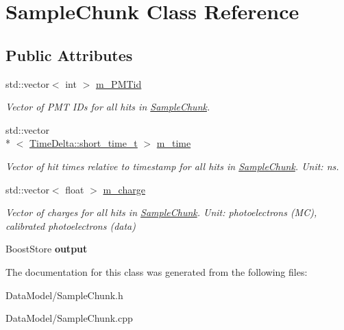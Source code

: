 \hypertarget{classSampleChunk}{\section{Sample\-Chunk Class Reference}
\label{classSampleChunk}
}
\subsection*{Public Attributes}
\begin{DoxyCompactItemize}
\item 
\hypertarget{classSampleChunk_ae227f86f1e9602b555a59145fe34fc12}{std\-::vector$<$ int $>$ \hyperlink{classSampleChunk_ae227f86f1e9602b555a59145fe34fc12}{m\-\_\-\-P\-M\-Tid}}\label{classSampleChunk_ae227f86f1e9602b555a59145fe34fc12}

\begin{DoxyCompactList}\small\item\em Vector of P\-M\-T I\-Ds for all hits in \hyperlink{classSampleChunk}{Sample\-Chunk}. \end{DoxyCompactList}\item 
\hypertarget{classSampleChunk_a2fcaaeb44f8cc604e6cc2eeec268ec1c}{std\-::vector\\*
$<$ \hyperlink{classTimeDelta_afe4b7adde6a0645a8ada61f39e198c8e}{Time\-Delta\-::short\-\_\-time\-\_\-t} $>$ \hyperlink{classSampleChunk_a2fcaaeb44f8cc604e6cc2eeec268ec1c}{m\-\_\-time}}\label{classSampleChunk_a2fcaaeb44f8cc604e6cc2eeec268ec1c}

\begin{DoxyCompactList}\small\item\em Vector of hit times relative to timestamp for all hits in \hyperlink{classSampleChunk}{Sample\-Chunk}. Unit\-: ns. \end{DoxyCompactList}\item 
\hypertarget{classSampleChunk_a5540aa8a6f27b1a5b4accf80bb91a333}{std\-::vector$<$ float $>$ \hyperlink{classSampleChunk_a5540aa8a6f27b1a5b4accf80bb91a333}{m\-\_\-charge}}\label{classSampleChunk_a5540aa8a6f27b1a5b4accf80bb91a333}

\begin{DoxyCompactList}\small\item\em Vector of charges for all hits in \hyperlink{classSampleChunk}{Sample\-Chunk}. Unit\-: photoelectrons (M\-C), calibrated photoelectrons (data) \end{DoxyCompactList}\item 
\hypertarget{classSampleChunk_a726be76a9337f10e715dc078cbede121}{Boost\-Store {\bfseries output}}\label{classSampleChunk_a726be76a9337f10e715dc078cbede121}

\end{DoxyCompactItemize}


The documentation for this class was generated from the following files\-:\begin{DoxyCompactItemize}
\item 
Data\-Model/Sample\-Chunk.\-h\item 
Data\-Model/Sample\-Chunk.\-cpp\end{DoxyCompactItemize}
